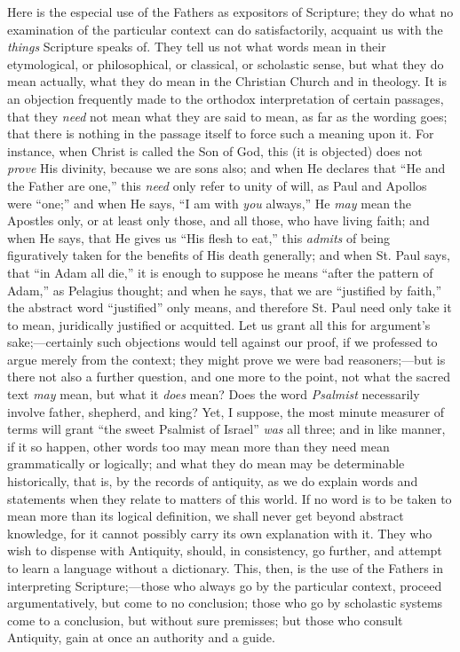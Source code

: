 Here is the especial use of the Fathers as expositors of Scripture;
they do what no examination of the particular context can do
satisfactorily, acquaint us with the \emph{things} Scripture speaks
of. They tell us not what words mean in their etymological, or
philosophical, or classical, or scholastic sense, but what they do
mean actually, what they do mean in the Christian Church and in
theology. It is an objection frequently made to the orthodox
interpretation of certain passages, that they \emph{need} not mean
what they are said to mean, as far as the wording goes; that there is
nothing in the passage itself to force such a meaning upon it. For
instance, when Christ is called the Son of God, this (it is objected)
does not \emph{prove} His divinity, because we are sons also; and when
He declares that ``He and the Father are one,'' this \emph{need}
only refer to unity of will, as Paul and Apollos were ``one;''
and when He says, ``I am with \emph{you} always,'' He \emph{may}
mean the Apostles only, or at least only those, and all those, who
have living faith; and when He says, that He gives us ``His flesh
to eat,'' this \emph{admits} of being figuratively taken for the
benefits of His death generally; and when St. Paul says, that ``in
Adam all die,'' it is enough to suppose he means ``after the
pattern of Adam,'' as Pelagius thought; and when he says, that we
are ``justified by faith,'' the abstract word
``justified'' only means, and therefore St. Paul need only
take it to mean, juridically justified or acquitted. Let us grant all
this for argument's sake;—certainly such objections would tell
against our proof, if we professed to argue merely from the context;
they might prove we were bad reasoners;—but is there not also a
further question, and one more to the point, not what the sacred text \emph{may}
mean, but what it \emph{does} mean? Does the word \emph{Psalmist}
necessarily involve father, shepherd, and king? Yet, I suppose, the
most minute measurer of terms will grant ``the sweet Psalmist of
Israel'' \emph{was} all three; and in like manner, if it so
happen, other words too may mean more than they need mean
grammatically or logically; and what they do mean may be
determinable historically, that is, by the records of antiquity, as we
do explain words and statements when they relate to matters of this
world. If no word is to be taken to mean more than its logical
definition, we shall never get beyond abstract knowledge, for it
cannot possibly carry its own explanation with it. They who wish to
dispense with Antiquity, should, in consistency, go further, and
attempt to learn a language without a dictionary. This, then, is the
use of the Fathers in interpreting Scripture;—those who always go by
the particular context, proceed argumentatively, but come to no
conclusion; those who go by scholastic systems come to a conclusion,
but without sure premisses; but those who consult Antiquity, gain at
once an authority and a guide.

